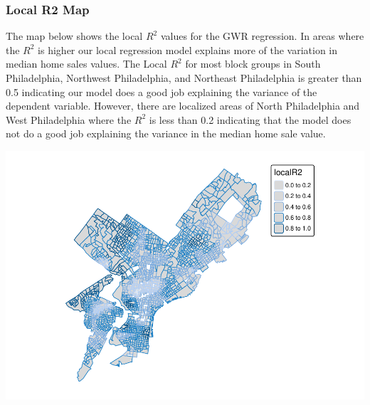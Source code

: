 \documentclass[
]{article}
\newenvironment{Shaded}{\begin{snugshade}}{\end{snugshade}}
\newcommand{\AttributeTok}[1]{\textcolor[rgb]{0.13,0.29,0.53}{#1}}
\newcommand{\ConstantTok}[1]{\textcolor[rgb]{0.56,0.35,0.01}{#1}}
\newcommand{\DecValTok}[1]{\textcolor[rgb]{0.00,0.00,0.81}{#1}}
\newcommand{\FloatTok}[1]{\textcolor[rgb]{0.00,0.00,0.81}{#1}}
\newcommand{\FunctionTok}[1]{\textcolor[rgb]{0.13,0.29,0.53}{\textbf{#1}}}
\newcommand{\NormalTok}[1]{#1}
\newcommand{\OtherTok}[1]{\textcolor[rgb]{0.56,0.35,0.01}{#1}}
\newcommand{\SpecialCharTok}[1]{\textcolor[rgb]{0.81,0.36,0.00}{\textbf{#1}}}
\newcommand{\StringTok}[1]{\textcolor[rgb]{0.31,0.60,0.02}{#1}}
\begin{document}
\hypertarget{local-r2-map}{%
\subsubsection{Local R2 Map}\label{local-r2-map}}

The map below shows the local \(R^2\) values for the GWR regression. In
areas where the \(R^2\) is higher our local regression model explains
more of the variation in median home sales values. The Local \(R^2\) for
most block groups in South Philadelphia, Northwest Philadelphia, and
Northeast Philadelphia is greater than 0.5 indicating our model does a
good job explaining the variance of the dependent variable. However,
there are localized areas of North Philadelphia and West Philadelphia
where the \(R^2\) is less than 0.2 indicating that the model does not do
a good job explaining the variance in the median home sale value.

\begin{Shaded}
\end{Shaded}

\includegraphics{HW2-SpatialRegression_files/figure-latex/local R2 map-1.pdf}
\end{document}

